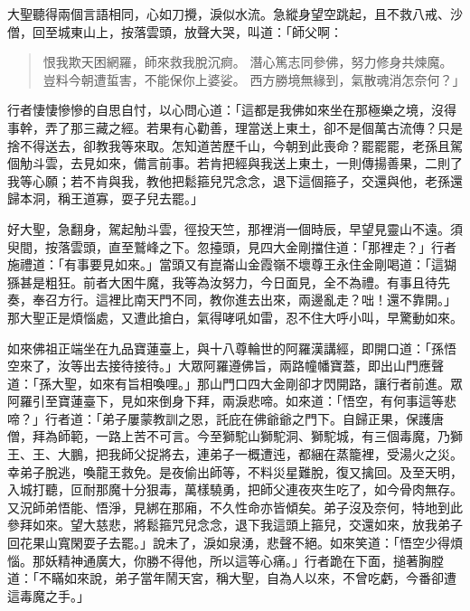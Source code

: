 大聖聽得兩個言語相同，心如刀攪，淚似水流。急縱身望空跳起，且不救八戒、沙僧，回至城東山上，按落雲頭，放聲大哭，叫道：「師父啊：
\begin{quote}
恨我欺天困網羅，師來救我脫沉痾。
潛心篤志同參佛，努力修身共煉魔。
豈料今朝遭蜇害，不能保你上婆娑。
西方勝境無緣到，氣散魂消怎奈何？」
\end{quote}

行者悽悽慘慘的自思自忖，以心問心道：「這都是我佛如來坐在那極樂之境，沒得事幹，弄了那三藏之經。若果有心勸善，理當送上東土，卻不是個萬古流傳？只是捨不得送去，卻教我等來取。怎知道苦歷千山，今朝到此喪命？罷罷罷，老孫且駕個觔斗雲，去見如來，備言前事。若肯把經與我送上東土，一則傳揚善果，二則了我等心願；若不肯與我，教他把鬆箍兒咒念念，退下這個箍子，交還與他，老孫還歸本洞，稱王道寡，耍子兒去罷。」

好大聖，急翻身，駕起觔斗雲，徑投天竺，那裡消一個時辰，早望見靈山不遠。須臾間，按落雲頭，直至鷲峰之下。忽擡頭，見四大金剛擋住道：「那裡走？」行者施禮道：「有事要見如來。」當頭又有崑崙山金霞嶺不壞尊王永住金剛喝道：「這猢猻甚是粗狂。前者大困牛魔，我等為汝努力，今日面見，全不為禮。有事且待先奏，奉召方行。這裡比南天門不同，教你進去出來，兩邊亂走？咄！還不靠開。」那大聖正是煩惱處，又遭此搶白，氣得哮吼如雷，忍不住大呼小叫，早驚動如來。

如來佛祖正端坐在九品寶蓮臺上，與十八尊輪世的阿羅漢講經，即開口道：「孫悟空來了，汝等出去接待接待。」大眾阿羅遵佛旨，兩路幢幡寶蓋，即出山門應聲道：「孫大聖，如來有旨相喚哩。」那山門口四大金剛卻才閃開路，讓行者前進。眾阿羅引至寶蓮臺下，見如來倒身下拜，兩淚悲啼。如來道：「悟空，有何事這等悲啼？」行者道：「弟子屢蒙教訓之恩，託庇在佛爺爺之門下。自歸正果，保護唐僧，拜為師範，一路上苦不可言。今至獅駝山獅駝洞、獅駝城，有三個毒魔，乃獅王、王、大鵬，把我師父捉將去，連弟子一概遭迍，都綑在蒸籠裡，受湯火之災。幸弟子脫逃，喚龍王救免。是夜偷出師等，不料災星難脫，復又擒回。及至天明，入城打聽，叵耐那魔十分狠毒，萬樣驍勇，把師父連夜夾生吃了，如今骨肉無存。又況師弟悟能、悟淨，見綁在那廂，不久性命亦皆傾矣。弟子沒及奈何，特地到此參拜如來。望大慈悲，將鬆箍咒兒念念，退下我這頭上箍兒，交還如來，放我弟子回花果山寬閑耍子去罷。」說未了，淚如泉湧，悲聲不絕。如來笑道：「悟空少得煩惱。那妖精神通廣大，你勝不得他，所以這等心痛。」行者跪在下面，搥著胸膛道：「不瞞如來說，弟子當年鬧天宮，稱大聖，自為人以來，不曾吃虧，今番卻遭這毒魔之手。」

